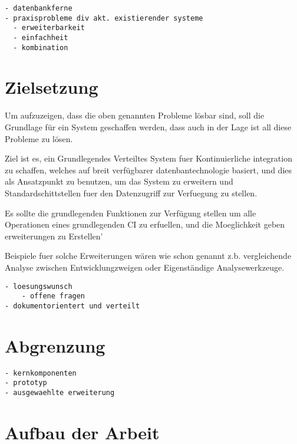 \begin{verbatim}
- datenbankferne
- praxisprobleme div akt. existierender systeme
  - erweiterbarkeit
  - einfachheit
  - kombination

\end{verbatim}

\section{Zielsetzung}

Um aufzuzeigen, dass die oben genannten Probleme lösbar sind,
soll die Grundlage für ein System geschaffen werden,
dass auch in der Lage ist all diese Probleme zu lösen.

Ziel ist es, ein Grundlegendes Verteiltes System fuer Kontinuierliche integration zu schaffen,
welches auf breit verfügbarer datenbantechnologie basiert,
und dies als Ansatzpunkt zu benutzen,
um das System zu erweitern und Standardschittstellen fuer den Datenzugriff zur Verfuegung zu stellen.

Es sollte die grundlegenden Funktionen zur Verfügung stellen um alle Operationen
eines grundlegenden CI zu erfuellen,
und die Moeglichkeit geben erweiterungen zu Erstellen'

Beispiele fuer solche Erweiterungen wären wie schon genannt
z.b. vergleichende Analyse zwischen Entwicklungzweigen oder Eigenständige Analysewerkzeuge.

\begin{verbatim}
- loesungswunsch
    - offene fragen
- dokumentorientert und verteilt
\end{verbatim}

\section{Abgrenzung}

\begin{verbatim}
- kernkomponenten
- prototyp
- ausgewaehlte erweiterung

\end{verbatim}

\section{Aufbau der Arbeit}



